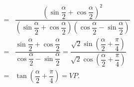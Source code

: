 \begin{vd}
{\begin{enumerate}
\begin{eqnarray*}
				&=& \dfrac{\left( \sin \dfrac{\alpha }{2}+\cos \dfrac{\alpha }{2} \right)^2}{\left( \sin \dfrac{\alpha }{2}+\cos \dfrac{\alpha }{2} \right)\left( \cos \dfrac{\alpha }{2}-\sin \dfrac{\alpha }{2} \right)} \\
				&=& \dfrac{\sin \dfrac{\alpha }{2}+\cos \dfrac{\alpha }{2}}{\cos \dfrac{\alpha }{2}-\sin \dfrac{\alpha }{2}}=\dfrac{\sqrt{2}\sin \left( \dfrac{\alpha }{2}+\dfrac{\pi }{4} \right)}{\sqrt{2}\cos \left( \dfrac{\alpha }{2}+\dfrac{\pi }{4} \right)}\\
				&=& \tan \left( \dfrac{\alpha }{2}+\dfrac{\pi }{4} \right)=VP.
			\end{eqnarray*}
		\end{enumerate}
	}
\end{vd}

